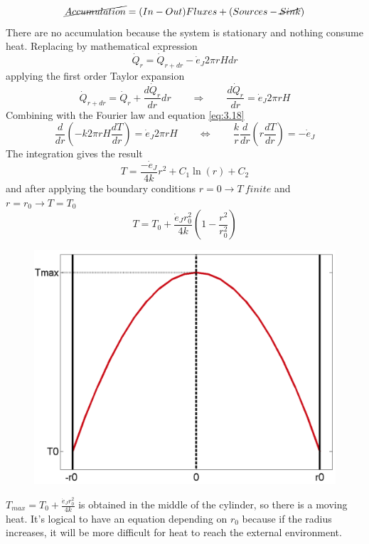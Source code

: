 	\begin{equation}
		\cancel{Accumulation} = (In - Out) Fluxes + (Sources - \cancel{Sink})
	\end{equation}
	There are no accumulation because the system is stationary and nothing consume heat. Replacing by mathematical expression
	\begin{equation}
		\dot{Q}_r = \dot{Q}_{r+dr} - \dot{e}_J 2\pi r H dr
	\end{equation}
	applying the first order Taylor expansion
	\begin{equation}
		\dot{Q}_{r+dr} = \dot{Q}_r + \frac{d\dot{Q}_r}{dr}dr \qquad \Rightarrow \qquad \frac{d\dot{Q}_r}{dr} = \dot{e}_J 2\pi rH 
	\end{equation}
	Combining with the Fourier law and equation \autoref{eq:3.18} 
	\begin{equation}
		\frac{d}{dr}\left(-k 2\pi rH\frac{dT}{dr}\right) = \dot{e}_J 2\pi r H \qquad \Leftrightarrow \qquad \frac{k}{r}\frac{d}{dr}\left(r\frac{dT}{dr}\right) = -\dot{e}_J
	\end{equation}
	The integration gives the result 
	\begin{equation}
		T = \frac{-\dot{e}_J}{4k}r^2 + C_1 \ln (r) +C_2
	\end{equation}
	and after applying the boundary conditions $r = 0 \rightarrow T \ finite$ and $r = r_0 \rightarrow T = T_0$
	\begin{equation}
		T = T_0 + \frac{\dot{e}_Jr_0^2}{4k}\left( 1-\frac{r^2}{r_0^2} \right)
	\end{equation}
	
	\begin{figure}
	\vspace{-10mm}
	\includegraphics[scale=0.15]{ch3/12}
	\end{figure}
	$T_{max} = T_0 + \frac{\dot{e}_Jr_0^2}{4k}$ is obtained in the middle of the cylinder, so there is a moving heat. It's logical to have an equation depending on $r_0$ because if the radius increases, it will be more difficult for heat to reach the external environment. \\
	
